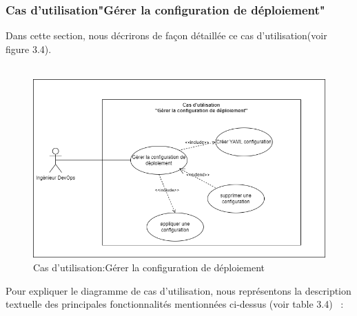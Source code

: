    \subsubsection{\Large Cas d'utilisation"Gérer la configuration de déploiement"}
   \textsf{\selectfont{} Dans cette section, nous décrirons de façon détaillée ce cas d'utilisation(voir figure 3.4).\\\texttt{}\\[0.01cm]
   }
   \begin{figure}[H]
    \begin{center}
    
        \includegraphics[width=15cm]{UserCase3.drawio.png}
  
    \end{center}
    
    \caption{Cas d'utilisation:Gérer la configuration de déploiement}
  \end{figure}
   \textsf{\selectfont{}
   Pour expliquer  le diagramme de cas d’utilisation, nous représentons la description textuelle des principales fonctionnalités mentionnées ci-dessus (voir table 3.4)  : \\}
